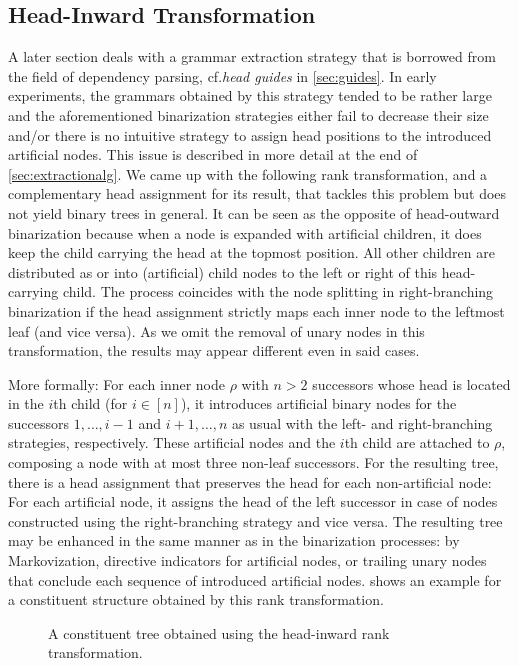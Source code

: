 \documentclass[../../document.tex]{subfiles}
\begin{document}
    \subsection{Head-Inward Transformation} \label{sec:extraction:bin:hi}
    A later section deals with a grammar extraction strategy that is borrowed from the field of dependency parsing, cf.\@ \emph{head guides} in \cref{sec:guides}.
    In early experiments, the grammars obtained by this strategy tended to be rather large and the aforementioned binarization strategies either fail to decrease their size and/or there is no intuitive strategy to assign head positions to the introduced artificial nodes.
    This issue is described in more detail at the end of \cref{sec:extractionalg}.
    We came up with the following rank transformation, and a complementary head assignment for its result, that tackles this problem but does not yield binary trees in general.
    It can be seen as the opposite of head-outward binarization because when a node is expanded with artificial children, it does keep the child carrying the head at the topmost position.
    All other children are distributed as or into (artificial) child nodes to the left or right of this head-carrying child.
    The process coincides with the node splitting in right-branching binarization if the head assignment strictly maps each inner node to the leftmost leaf (and vice versa).
    As we omit the removal of unary nodes in this transformation, the results may appear different even in said cases.

    More formally: For each inner node \(\rho\) with \(n > 2\) successors whose head is located in the \(i\)th child (for \(i \in [n]\)), it introduces artificial binary nodes for the successors \(1, \ldots, i-1\) and \(i+1, \ldots, n\) as usual with the left- and right-branching strategies, respectively.
    These artificial nodes and the \(i\)th child are attached to \(\rho\), composing a node with at most three non-leaf successors.
    For the resulting tree, there is a head assignment that preserves the head for each non-artificial node:
        For each artificial node, it assigns the head of the left successor in case of nodes constructed using the right-branching strategy and vice versa.
    The resulting tree may be enhanced in the same manner as in the binarization processes: by Markovization, directive indicators for artificial nodes, or trailing unary nodes that conclude each sequence of introduced artificial nodes.
     shows an example for a constituent structure obtained by this rank transformation.

    \begin{figure}
        \centering
        
        \caption{\label{fig:ex:head-inward}
            A constituent tree obtained using the head-inward rank transformation.
        }
    \end{figure}
\end{document}
